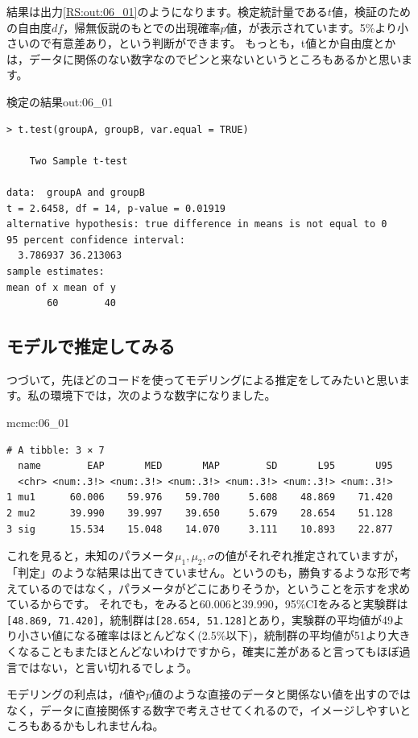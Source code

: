 \documentclass{ltjsbook}
\begin{document}
結果は出力\ref{RS:out:06_01}のようになります。検定統計量である$t$値，検証のための自由度$df$，帰無仮説のもとでの出現確率$p$値，が表示されています。5\%より小さいので有意差あり，という判断ができます。
もっとも，t値とか自由度とかは，データに関係のない数字なのでピンと来ないというところもあるかと思います。
\begin{Rscreen}{検定の結果}{out:06_01}
	\begin{verbatim}
> t.test(groupA, groupB, var.equal = TRUE)

	Two Sample t-test

data:  groupA and groupB
t = 2.6458, df = 14, p-value = 0.01919
alternative hypothesis: true difference in means is not equal to 0
95 percent confidence interval:
  3.786937 36.213063
sample estimates:
mean of x mean of y 
       60        40 
\end{verbatim}
\end{Rscreen}

\subsection{モデルで推定してみる}
つづいて，先ほどのコードを使ってモデリングによる推定をしてみたいと思います。私の環境下では，次のような数字になりました。

\begin{MCMCout}{}{mcmc:06_01}
	\begin{verbatim}
# A tibble: 3 × 7
  name        EAP       MED       MAP        SD       L95       U95
  <chr> <num:.3!> <num:.3!> <num:.3!> <num:.3!> <num:.3!> <num:.3!>
1 mu1      60.006    59.976    59.700     5.608    48.869    71.420
2 mu2      39.990    39.997    39.650     5.679    28.654    51.128
3 sig      15.534    15.048    14.070     3.111    10.893    22.877
\end{verbatim}
\end{MCMCout}
これを見ると，未知のパラメータ$\mu_1, \mu_2, \sigma$の値がそれぞれ推定されていますが，「判定」のような結果は出てきていません。というのも，勝負するような形で考えているのではなく，パラメータがどこにありそうか，ということを示すを求めているからです。
それでも，をみると60.006と39.990，95\%CIをみると実験群は\verb|[48.869, 71.420]|，統制群は\verb|[28.654, 51.128]|とあり，実験群の平均値が49より小さい値になる確率はほとんどなく(2.5\%以下)，統制群の平均値が51より大きくなることもまたほとんどないわけですから，確実に差があると言ってもほぼ過言ではない，と言い切れるでしょう。

モデリングの利点は，$t$値や$p$値のような直接のデータと関係ない値を出すのではなく，データに直接関係する数字で考えさせてくれるので，イメージしやすいところもあるかもしれませんね。
\end{document}
